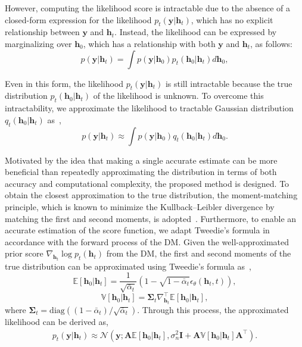 \documentclass[lettersize,journal]{IEEEtran}
\begin{document}
However, computing the likelihood score is intractable due to the absence of a closed-form expression for the likelihood $p_{t}(\mathbf{y}|\mathbf{h}_{t})$, which has no explicit relationship between $\mathbf{y}$ and $\mathbf{h}_{t}$. Instead, the likelihood can be expressed by marginalizing over $\mathbf{h}_{0}$, which has a relationship with both $\mathbf{y}$ and $\mathbf{h}_{t}$, as follows:
\begin{equation}
p(\mathbf{y}|\mathbf{h}_{t}) = \int p(\mathbf{y}|\mathbf{h}_{0})p_{t}(\mathbf{h}_{0}|\mathbf{h}_{t})d\mathbf{h}_{0},
\end{equation}

Even in this form, the likelihood $p_{t}(\mathbf{y}|\mathbf{h}_{t})$ is still intractable because the true distribution $p_{t}(\mathbf{h}_{0}|\mathbf{h}_{t})$ of the likelihood is unknown. To overcome this intractability, we approximate the likelihood to tractable Gaussian distribution $q_{t}(\mathbf{h}_{0}|\mathbf{h}_{t})$ as~\cite{arvinteMIMOChannelEstimation2023,zhouGenerativeDiffusionModels2025},
\begin{equation}
p(\mathbf{y}|\mathbf{h}_{t}) \approx \int p(\mathbf{y}|\mathbf{h}_{0})q_{t}(\mathbf{h}_{0}|\mathbf{h}_{t})d\mathbf{h}_{0}.
\end{equation}

Motivated by the idea that making a single accurate estimate can be more beneficial than repeatedly approximating the distribution in terms of both accuracy and computational complexity, the proposed method is designed. To obtain the closest approximation to the true distribution, the moment-matching principle, which is known to minimize the Kullback–Leibler divergence by matching the first and second moments, is adopted~\cite{bishopPatternRecognitionMachine2006}. Furthermore, to enable an accurate estimation of the score function, we adapt Tweedie’s formula in accordance with the forward process of the DM.
Given the well-approximated prior score $\nabla_{\mathbf{h}_{t}}\log p_{t}(\mathbf{h}_{t})$ from the DM, the first and second moments of the true distribution can be approximated using Tweedie's formula as~\cite{efronTweediesFormulaSelection2011},
\begin{equation}
\mathbb{E}[\mathbf{h}_{0}|\mathbf{h}_{t}] = \frac{1}{\sqrt{ \bar{\alpha}_{t} }}(1-\sqrt{ 1-\bar{\alpha}_{t} }\epsilon_{\theta}(\mathbf{h}_{t},t)),
\end{equation}
\begin{equation}
\mathbb{V}[\mathbf{h}_{0}|\mathbf{h}_{t}] = \boldsymbol{\Sigma}_{t}\nabla_{\mathbf{h}_{t}}^{\top}\mathbb{E}[\mathbf{h}_{0}|\mathbf{h}_{t}],
\end{equation}
where $\boldsymbol{\Sigma}_{t} = \text{diag}((1-\bar{\alpha}_{t}) / \sqrt{ \bar{\alpha}_{t} })$. Through this process, the approximated likelihood can be derived as,
\begin{equation}
\begin{aligned}
p_{t}(\mathbf{y}|\mathbf{h}_{t}) \approx \mathcal{N}(\mathbf{y}; \mathbf{A}\mathbb{E}[\mathbf{h}_{0}|\mathbf{h}_{t}], \sigma_{n}^{2}\mathbf{I}+\mathbf{A}\mathbb{V}[\mathbf{h}_{0}|\mathbf{h}_{t}]\mathbf{A}^{\top}).
\end{aligned}
\end{equation}
\end{document}
